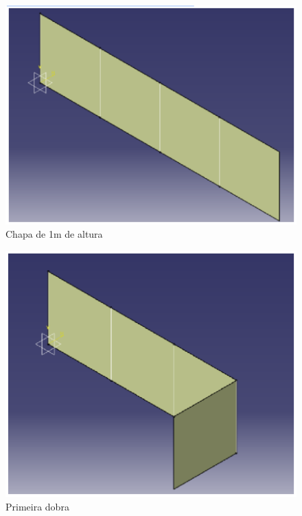 \begin{figure}[H]
 \centering
   \includegraphics[keepaspectratio=true,scale=0.8]{figuras/estrutura12.eps}
 \caption{Chapa de 1m de altura}
 \label{estrutura12}
\end{figure}
\begin{figure}[H]
 \centering
   \includegraphics[keepaspectratio=true,scale=0.8]{figuras/estrutura13.eps}
 \caption{Primeira dobra}
 \label{estrutura13}
\end{figure}
